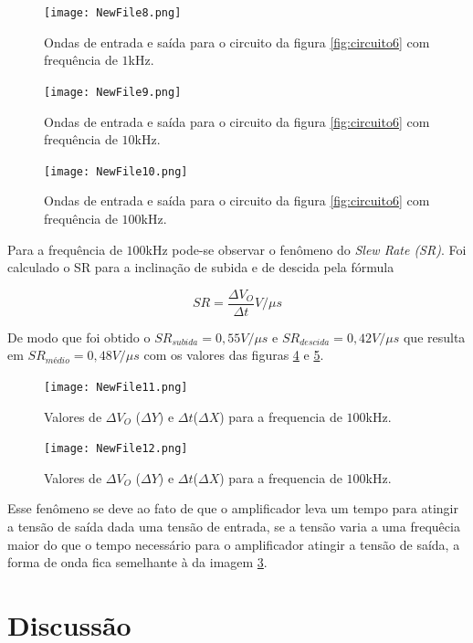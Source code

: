 \documentclass{abntex2}
\begin{document}
\begin{figure}[h]
  \centering
  \texttt{[image: NewFile8.png]}
  \caption{Ondas de entrada e saída para o circuito da figura \ref{fig:circuito6} com frequência de $1$kHz.}
  \label{fig:inout8}
\end{figure}

\begin{figure}[h]
  \centering
  \texttt{[image: NewFile9.png]}
  \caption{Ondas de entrada e saída para o circuito da figura \ref{fig:circuito6} com frequência de $10$kHz.}
  \label{fig:inout9}
\end{figure}

\begin{figure}[h]
  \centering
  \texttt{[image: NewFile10.png]}
  \caption{Ondas de entrada e saída para o circuito da figura \ref{fig:circuito6} com frequência de $100$kHz.}
  \label{fig:inout10}
\end{figure}

Para a frequência de $100$kHz pode-se observar o fenômeno do \emph{Slew Rate (SR)}. Foi calculado o SR para a inclinação de subida e de descida pela fórmula

\[{SR} = \frac{\Delta V_O}{\Delta t} V/\mu s\]

De modo que foi obtido o ${SR}_{subida} = 0,55V/\mu s$ e ${SR}_{descida} = 0,42V/\mu s$ que resulta em ${SR}_{médio} = 0,48V/\mu s$ com os valores das figuras \ref{fig:inout11} e \ref{fig:inout12}.

\begin{figure}[h]
  \centering
  \texttt{[image: NewFile11.png]}
  \caption{Valores de $\Delta V_O$ ($\Delta Y$) e $\Delta t$($\Delta X$) para a frequencia de $100$kHz.}
  \label{fig:inout11}
\end{figure}

\begin{figure}[h]
  \centering
  \texttt{[image: NewFile12.png]}
  \caption{Valores de $\Delta V_O$ ($\Delta Y$) e $\Delta t$($\Delta X$) para a frequencia de $100$kHz.}
  \label{fig:inout12}
\end{figure}

Esse fenômeno se deve ao fato de que o amplificador leva um tempo para atingir a tensão de saída dada uma tensão de entrada, se a tensão varia a uma frequêcia maior do que o tempo necessário para o amplificador atingir a tensão de saída, a forma de onda fica semelhante à da imagem \ref{fig:inout10}.

\chapter{Discussão}
\end{document}
